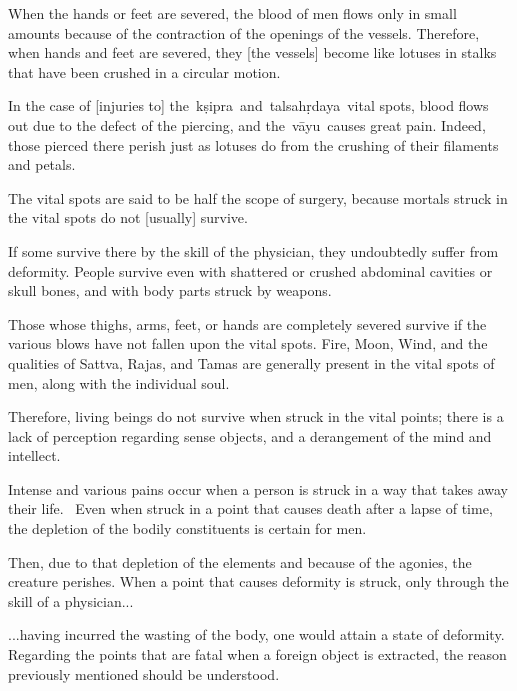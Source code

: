 \begin{translation}
\begin{tt}
\item[30]

\item[31]
When the hands or feet are severed, the blood of men flows only in small amounts because of the contraction of the openings of the vessels. Therefore, when hands and feet are severed, they [the vessels] become like lotuses in stalks that have been crushed in a circular motion.

\item[32]
In the case of [injuries to] the kṣipra and talsahṛdaya vital spots, blood flows out due to the defect of the piercing, and the vāyu causes great pain. Indeed, those pierced there perish just as lotuses do from the crushing of their filaments and petals. 


\item[33]
The vital spots are said to be half the scope of surgery, because mortals struck in the vital spots do not [usually] survive. 

\item[34]
If some survive there by the skill of the physician, they undoubtedly suffer from deformity.
People survive even with shattered or crushed abdominal cavities or skull bones, and with body parts struck by weapons.


\item[35]
Those whose thighs, arms, feet, or hands are completely severed survive if the various blows have not fallen upon the vital spots.
Fire, Moon, Wind, and the qualities of Sattva, Rajas, and Tamas are generally present in the vital spots of men, along with the individual soul.

\item[36]
Therefore, living beings do not survive when struck in the vital points; there is a lack of perception regarding sense objects, and a derangement of the mind and intellect. 


\item[37]
Intense and various pains occur when a person is struck in a way that takes away their life. 
Even when struck in a point that causes death after a lapse of time, the depletion of the bodily constituents is certain for men. 

\item[38]
Then, due to that depletion of the elements and because of the agonies, the creature perishes. When a point that causes deformity is struck, only through the skill of a physician...

\item[39]
...having incurred the wasting of the body, one would attain a state of deformity. Regarding the points that are fatal when a foreign object is extracted, the reason previously mentioned should be understood.


\end{tt}
\end{translation}
